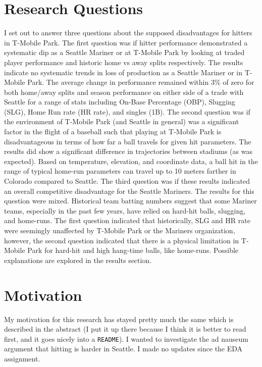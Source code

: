 \documentclass[11pt,twocolumn]{article}
\begin{document}
\section{Research Questions}
I set out to answer three questions about the supposed disadvantages for hitters in T-Mobile Park. The first question was if hitter performance demonstrated a systematic dip as a Seattle Mariner or at T-Mobile Park by looking at traded player performance and historic home vs away splits respectively. The results indicate no systematic trends in loss of production as a Seattle Mariner or in T-Mobile Park. The average change in performance remained within 3\% of zero for both home/away splits and season performance on either side of a trade with Seattle for a range of stats including On-Base Percentage (OBP), Slugging (SLG), Home Run rate (HR rate), and singles (1B). The second question was if the environment of T-Mobile Park (and Seattle in general) was a significant factor in the flight of a baseball such that playing at T-Mobile Park is disadvantageous in terms of how far a ball travels for given hit parameters. The results did show a significant difference in trajectories between stadiums (as was expected). Based on temperature, elevation, and coordinate data, a ball hit in the range of typical home-run parameters can travel up to 10 meters farther in Colorado compared to Seattle. The third question was if these results indicated an overall competitive disadvantage for the Seattle Mariners. The results for this question were mixed. Historical team batting numbers suggest that some Mariner teams, especially in the past few years, have relied on hard-hit balls, slugging, and home-runs. The first question indicated that historically, SLG and HR rate were seemingly unaffected by T-Mobile Park or the Mariners organization, however, the second question indicated that there is a physical limitation in T-Mobile Park for hard-hit and high hang-time balls, like home-runs. Possible explanations are explored in the results section.

\section{Motivation}
My motivation for this research has stayed pretty much the same which is described in the abstract (I put it up there because I think it is better to read first, and it goes nicely into a \texttt{README}). I wanted to investigate the ad nauseum argument that hitting is harder in Seattle. I made no updates since the EDA assignment.
\end{document}

